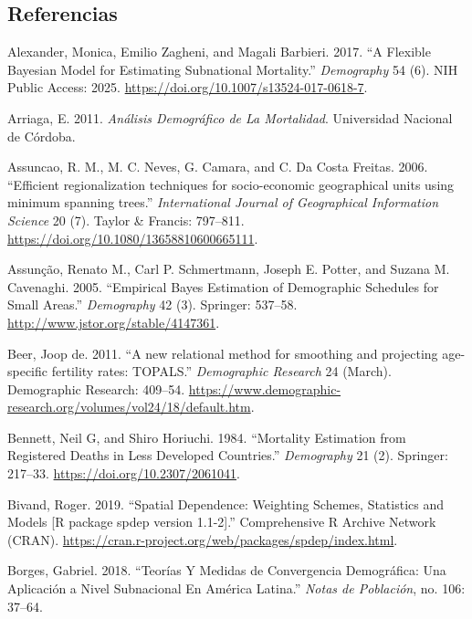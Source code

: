 \documentclass[12pt,]{article}
\begin{document}
\hypertarget{referencias}{%
\subsection*{Referencias}\label{referencias}}

\hypertarget{refs}{}
\leavevmode\hypertarget{ref-Alexander2017}{}%
Alexander, Monica, Emilio Zagheni, and Magali Barbieri. 2017. ``A
Flexible Bayesian Model for Estimating Subnational Mortality.''
\emph{Demography} 54 (6). NIH Public Access: 2025.
\url{https://doi.org/10.1007/s13524-017-0618-7}.

\leavevmode\hypertarget{ref-Arriaga2011}{}%
Arriaga, E. 2011. \emph{Análisis Demográfico de La Mortalidad}.
Universidad Nacional de Córdoba.

\leavevmode\hypertarget{ref-AssunCao2006}{}%
Assuncao, R. M., M. C. Neves, G. Camara, and C. Da Costa Freitas. 2006.
``Efficient regionalization techniques for socio-economic geographical
units using minimum spanning trees.'' \emph{International Journal of
Geographical Information Science} 20 (7). Taylor \& Francis: 797--811.
\url{https://doi.org/10.1080/13658810600665111}.

\leavevmode\hypertarget{ref-Assuncao2005}{}%
Assunção, Renato M., Carl P. Schmertmann, Joseph E. Potter, and Suzana
M. Cavenaghi. 2005. ``Empirical Bayes Estimation of Demographic
Schedules for Small Areas.'' \emph{Demography} 42 (3). Springer:
537--58. \url{http://www.jstor.org/stable/4147361}.

\leavevmode\hypertarget{ref-deBeer2011}{}%
Beer, Joop de. 2011. ``A new relational method for smoothing and
projecting age-specific fertility rates: TOPALS.'' \emph{Demographic
Research} 24 (March). Demographic Research: 409--54.
\url{https://www.demographic-research.org/volumes/vol24/18/default.htm}.

\leavevmode\hypertarget{ref-Bennett_Horiuchi_1984}{}%
Bennett, Neil G, and Shiro Horiuchi. 1984. ``Mortality Estimation from
Registered Deaths in Less Developed Countries.'' \emph{Demography} 21
(2). Springer: 217--33. \url{https://doi.org/10.2307/2061041}.

\leavevmode\hypertarget{ref-Bivand2019}{}%
Bivand, Roger. 2019. ``Spatial Dependence: Weighting Schemes, Statistics
and Models {[}R package spdep version 1.1-2{]}.'' Comprehensive R
Archive Network (CRAN).
\url{https://cran.r-project.org/web/packages/spdep/index.html}.

\leavevmode\hypertarget{ref-Borges2018}{}%
Borges, Gabriel. 2018. ``Teorías Y Medidas de Convergencia Demográfica:
Una Aplicación a Nivel Subnacional En América Latina.'' \emph{Notas de
Población}, no. 106: 37--64.
\end{document}
